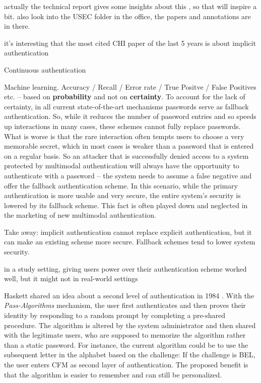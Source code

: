 	actually the technical report gives some insights about this \cite{Stockinger2011ImplicitAuthentication}, so that will inspire a bit.
	also look into the USEC folder in the office, the papers and annotations are in there.
	
		it's interesting that the most cited CHI paper of the last 5 years is about implicit authentication \cite{DeLuca2012TouchMeOnce}
		
		\cite{Roalter2013SmartphoneProxy}
		
		Continuous authentication \cite{Peisert2013PriciplesAuthentication}
	
	Machine learning. Accuracy / Recall / Error rate / True Positve / False Positives etc. -- based on \textbf{probability} and not on \textbf{certainty}. To account for the lack of certainty, in all current state-of-the-art mechanisms passwords serve as fallback authentication. So, while it reduces the number of password entries and so speeds up interactions in many cases, these schemes cannot fully replace passwords. What is worse is that the rare interaction often tempts users to choose a very memorable secret, which in most cases is weaker than a password that is entered on a regular basis. So an attacker that is successfully denied access to a system protected by multimodal authentication will always have the opportunity to authenticate with a password -- the system needs to assume a false negative and offer the fallback authentication scheme. In this scenario, while the primary authentication is more usable and very secure, the entire system's security is lowered by its fallback scheme. This fact is often played down and neglected in the marketing of new multimodal authentication. 
	
	Take away: implicit authentication cannot replace explicit authentication, but it can make an existing scheme more secure. Fallback schemes tend to lower system security. 
	

in a study setting, giving users power over their authentication scheme worked well, but it might not in real-world settings \cite{Forget2015CYOA}

Haskett shared an idea about a second level of authentication in 1984 \cite{Haskett1984PassAlgorithms}. With the \textit{Pass-Algorithms} mechanism, the user first authenticates and then proves their identity by responding to a random prompt by completing a pre-shared procedure. The algorithm is altered by the system administrator and then shared with the legitimate users, who are supposed to memorize the algorithm rather than a static password. For instance, the current algorithm could be to use the subsequent letter in the alphabet based on the challenge: If the challenge is BEL, the user enters CFM as second layer of authentication. The proposed benefit is that the algorithm is easier to remember and can still be personalized. 
	
